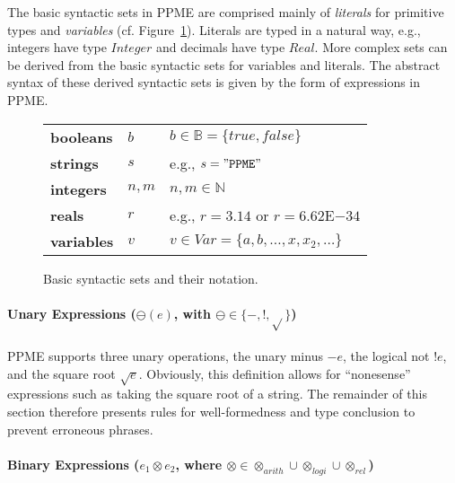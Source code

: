   The basic syntactic sets in PPME are comprised mainly of \emph{literals} for
  primitive types and \emph{variables} (cf.
  Figure~\ref{tab:typesystem:basic_syntactic_sets}). Literals are typed in a natural
  way, e.g., integers have type $Integer$ and decimals have type $Real$. More
  complex sets can be derived from the basic syntactic sets for variables and
  literals. The abstract syntax of these derived syntactic sets is given by the form
  of expressions in PPME.
  \begin{figure}[tp]
    \centering
    \footnotesize
    \setlength{\tabcolsep}{0.5em}
    \begin{tabular}{lll}
      \toprule
      \textbf{booleans}  & $b$    & $b \in \mathbb{B} = \{ true, false \}$         \\
      \textbf{strings}   & $s$    & e.g., $s = \mathtt{"PPME"}$                  \\
      \textbf{integers}  & $n, m$ & $n, m \in \mathbb{N}$                          \\
      \textbf{reals}     & $r$    & e.g., $r = 3.14$ or $r = 6.62\mathrm{E}{-34}$\\
      \textbf{variables} & $v$    & $v \in Var = \{ a, b, \dots, x, x_2, \dots \}$
      \\
      \bottomrule
    \end{tabular}
    \caption{Basic syntactic sets and their notation.}
    \label{tab:typesystem:basic_syntactic_sets} %
  \end{figure}

  \paragraph{Unary Expressions ($\ominus(e)$, with $\ominus \in \{ -, !, \sqrt{} \}$)}
  \label{par:unary_expressions}

    PPME supports three unary operations, the unary minus $-e$, the logical not $!e$,
    and the square root $\sqrt{e}$. Obviously, this definition  allows for
    \enquote{nonesense} expressions such as taking the square root of a string. The
    remainder of this section therefore presents rules for well-formedness and type
    conclusion to prevent erroneous phrases.

  \paragraph{Binary Expressions ($e_1 \otimes e_2$, where $\otimes \in \otimes_\mathit{arith} \cup \otimes_\mathit{logi} \cup \otimes_\mathit{rel}$)}
  \label{par:binary_expressions}

